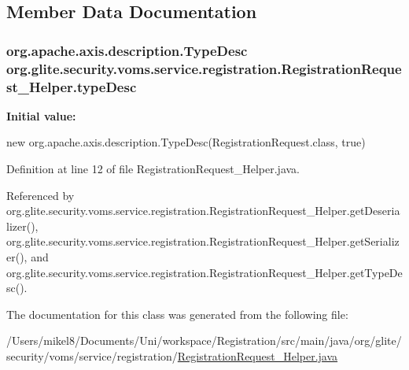 \subsection{Member Data Documentation}
\hypertarget{classorg_1_1glite_1_1security_1_1voms_1_1service_1_1registration_1_1RegistrationRequest__Helper_af760a1fa2f4c2af364fda1530f9429e3}{
\subsubsection[{typeDesc}]{\setlength{\rightskip}{0pt plus 5cm}org.apache.axis.description.TypeDesc {\bf org.glite.security.voms.service.registration.RegistrationRequest\_\-Helper.typeDesc}}}
\label{classorg_1_1glite_1_1security_1_1voms_1_1service_1_1registration_1_1RegistrationRequest__Helper_af760a1fa2f4c2af364fda1530f9429e3}
{\bfseries Initial value:}
\begin{DoxyCode}

        new org.apache.axis.description.TypeDesc(RegistrationRequest.class, true)
      
\end{DoxyCode}


Definition at line 12 of file RegistrationRequest\_\-Helper.java.



Referenced by org.glite.security.voms.service.registration.RegistrationRequest\_\-Helper.getDeserializer(), org.glite.security.voms.service.registration.RegistrationRequest\_\-Helper.getSerializer(), and org.glite.security.voms.service.registration.RegistrationRequest\_\-Helper.getTypeDesc().



The documentation for this class was generated from the following file:\begin{DoxyCompactItemize}
\item 
/Users/mikel8/Documents/Uni/workspace/Registration/src/main/java/org/glite/security/voms/service/registration/\hyperlink{RegistrationRequest__Helper_8java}{RegistrationRequest\_\-Helper.java}\end{DoxyCompactItemize}
